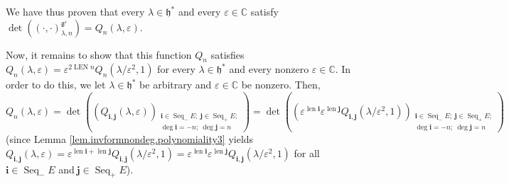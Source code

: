 \documentclass
[numbers=enddot,12pt,final,onecolumn,german,notitlepage]{scrartcl}%
\theoremstyle{definition}
\begin{document}
We have thus proven that every $\lambda\in\mathfrak{h}^{\ast}$ and every
$\varepsilon\in\mathbb{C}$ satisfy $\det\left(  \left(  \cdot,\cdot\right)
_{\lambda,n}^{\mathfrak{g}^{\varepsilon}}\right)  =Q_{n}\left(  \lambda
,\varepsilon\right)  $.

Now, it remains to show that this function $Q_{n}$ satisfies $Q_{n}\left(
\lambda,\varepsilon\right)  =\varepsilon^{2\operatorname*{LEN}n}Q_{n}\left(
\lambda/\varepsilon^{2},1\right)  $ for every $\lambda\in\mathfrak{h}^{\ast}$
and every nonzero $\varepsilon\in\mathbb{C}$. In order to do this, we let
$\lambda\in\mathfrak{h}^{\ast}$ be arbitrary and $\varepsilon\in\mathbb{C}$ be
nonzero. Then,
\begin{equation}
Q_{n}\left(  \lambda,\varepsilon\right)  =\det\left(  \left(  Q_{\mathbf{i}%
,\mathbf{j}}\left(  \lambda,\varepsilon\right)  \right)
_{\substack{\mathbf{i}\in\operatorname*{Seq}\nolimits_{-}E;\ \mathbf{j}%
\in\operatorname*{Seq}\nolimits_{+}E;\\\deg\mathbf{i}=-n;\ \deg\mathbf{j}%
=n}}\right)  =\det\left(  \left(  \varepsilon^{\operatorname*{len}\mathbf{i}%
}\varepsilon^{\operatorname*{len}\mathbf{j}}Q_{\mathbf{i},\mathbf{j}}\left(
\lambda/\varepsilon^{2},1\right)  \right)  _{\substack{\mathbf{i}%
\in\operatorname*{Seq}\nolimits_{-}E;\ \mathbf{j}\in\operatorname*{Seq}%
\nolimits_{+}E;\\\deg\mathbf{i}=-n;\ \deg\mathbf{j}=n}}\right)
\label{pf.invformnondeg.polynomiality5.1}%
\end{equation}
(since Lemma \ref{lem.invformnondeg.polynomiality3} yields $Q_{\mathbf{i}%
,\mathbf{j}}\left(  \lambda,\varepsilon\right)  =\varepsilon
^{\operatorname*{len}\mathbf{i}+\operatorname*{len}\mathbf{j}}Q_{\mathbf{i}%
,\mathbf{j}}\left(  \lambda/\varepsilon^{2},1\right)  =\varepsilon
^{\operatorname*{len}\mathbf{i}}\varepsilon^{\operatorname*{len}\mathbf{j}%
}Q_{\mathbf{i},\mathbf{j}}\left(  \lambda/\varepsilon^{2},1\right)  $ for all
$\mathbf{i}\in\operatorname*{Seq}\nolimits_{-}E$ and$\ \mathbf{j}%
\in\operatorname*{Seq}\nolimits_{+}E$).
\end{document}
